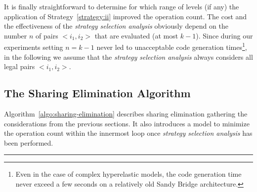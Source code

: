It is finally straightforward to determine for which range of levels (if any) the application of Strategy~\ref{strategy:ii} improved the operation count. The cost and the effectiveness of the {\em strategy selection analysis} obviously depend on the number $n$ of pairs ${<}i_1, i_2{>}$ that are evaluated (at most $k - 1$). Since during our experiments setting $n = k - 1$ never led to unacceptable code generation times\footnote{Even in the case of complex hyperelastic models, the code generation time never exceed a few seconds on a relatively old Sandy Bridge architecture.}, in the following we assume that the {\em strategy selection analysis} always considers all legal pairs ${<}i_1, i_2{>}$.


\subsection{The Sharing Elimination Algorithm}
\label{sec:se-algo}
Algorithm~\ref{algo:sharing-elimination} describes sharing elimination gathering the considerations from the previous sections. It also introduces a model to minimize the operation count within the innermost loop once {\em strategy selection analysis} has been performed.

\noindent\rule[0.01ex]{\linewidth}{0.7pt}

